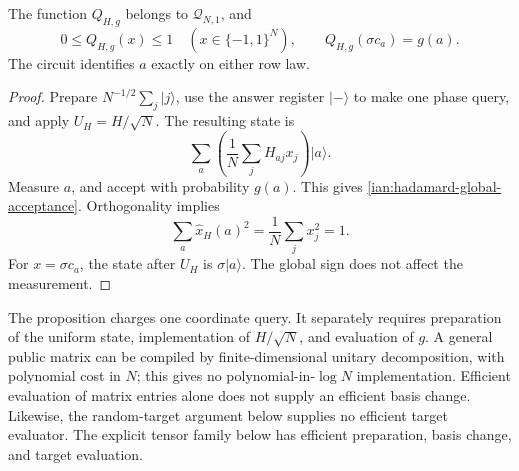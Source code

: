 \begin{proposition}
\label{ian:hadamard-one-query}
The function \(Q_{H,g}\) belongs to \(\mathcal Q_{N,1}\), and
\[
 0\le Q_{H,g}(x)\le1
 \quad(x\in\{-1,1\}^N),
 \qquad
 Q_{H,g}(\sigma c_a)=g(a).
\]
The circuit identifies \(a\) exactly on either row law.
\end{proposition}
\begin{proof}
Prepare \(N^{-1/2}\sum_j|j\rangle\), use the answer register \(|-\rangle\) to make one phase query, and apply \(U_H=H/\sqrt N\). The resulting state is
\[
 \sum_a\left(\frac1N\sum_jH_{aj}x_j\right)|a\rangle .
\]
Measure \(a\), and accept with probability \(g(a)\). This gives
\eqref{ian:hadamard-global-acceptance}. Orthogonality implies
\[
 \sum_a\widehat x_H(a)^2
 =\frac1N\sum_jx_j^2=1.
\]
For \(x=\sigma c_a\), the state after \(U_H\) is \(\sigma|a\rangle\). The global sign does not affect the measurement.
\end{proof}

\begin{remark}
\label{ian:hadamard-general-gates}
The proposition charges one coordinate query. It separately requires preparation of the uniform state, implementation of \(H/\sqrt N\), and evaluation of \(g\). A general public matrix can be compiled by finite-dimensional unitary decomposition, with polynomial cost in \(N\); this gives no polynomial-in-\(\log N\) implementation. Efficient evaluation of matrix entries alone does not supply an efficient basis change. Likewise, the random-target argument below supplies no efficient target evaluator. The explicit tensor family below has efficient preparation, basis change, and target evaluation.
\end{remark}

